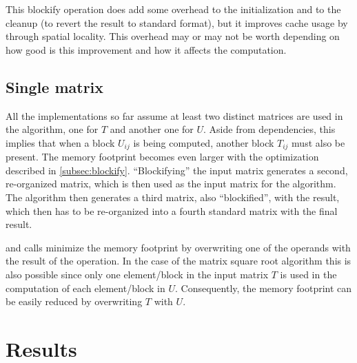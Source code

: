 \documentclass[../thesis]{subfiles}
\begin{document}
		This blockify operation does add some overhead to the initialization and to the cleanup (to revert the result to standard format), but it improves cache usage by through spatial locality. This overhead may or may not be worth depending on how good is this improvement and how it affects the computation.

		\subsection{Single matrix}
		All the implementations so far assume at least two distinct matrices are used in the algorithm, one for $T$ and another one for $U$. Aside from dependencies, this implies that when a block $U_{ij}$ is being computed, another block $T_{ij}$ must also be present. The memory footprint becomes even larger with the optimization described in \cref{subsec:blockify}. ``Blockifying'' the input matrix generates a second, re-organized matrix, which is then used as the input matrix for the algorithm. The algorithm then generates a third matrix, also ``blockified'', with the result, which then has to be re-organized into a fourth standard matrix with the final result.

		\blas and \lapack calls minimize the memory footprint by overwriting one of the operands with the result of the operation. In the case of the matrix square root algorithm this is also possible since only one element/block in the input matrix $T$ is used in the computation of each element/block in $U$. Consequently, the memory footprint can be easily reduced by overwriting $T$ with $U$.
	\section{Results}
\end{document}
